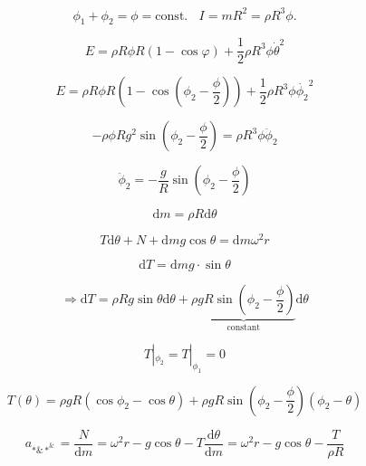 \documentclass{article}
\begin{document}
    $$
    \phi_1+\phi_2=\phi=\mathrm{const}.\ \ \ \ I=mR^2=\rho R^3\phi.
    $$


    $$
    E=\rho R\phi R(1-\cos\varphi)+\frac{1}{2}\rho R^3\phi\dot{\theta}^2
    $$

    $$
    E=\rho R\phi R(1-\cos(\phi_2-\frac{\phi}{2}))+\frac{1}{2}\rho R^3\phi\dot{\phi_2}^2
    $$

    $$
    -\rho\phi Rg^2\sin(\phi_2-\frac{\phi}{2})=\rho R^3\phi\ddot{\phi}_2
    $$

    $$
    \ddot{\phi}_2=-\frac{g}{R}\sin(\phi_2-\frac{\phi}{2})
    $$

    $$
    \mathrm{d}m=\rho R\mathrm{d}\theta 
    $$

    $$
    T\mathrm{d}\theta+N+\mathrm{d}mg\cos\theta=\mathrm{d}m\omega^2r
    $$

    $$
    \mathrm{d}T=\mathrm{d}mg\cdot\sin\theta 
    $$

    $$
    \Rightarrow\mathrm{d}T=\rho Rg\sin\theta\mathrm{d}\theta+\underbrace{\rho gR\sin(\phi_2-\frac{\phi}{2})}_{\mathrm{constant}}\mathrm{d}\theta
    $$

    $$
    T|_{\phi_2}=T|_{\phi_1}=0
    $$

    \begin{equation}
        T(\theta)=\rho gR(\cos{\phi_2}-\cos\theta)+\rho gR\sin(\phi_2-\frac{\phi}{2})(\phi_2-\theta)
    \end{equation}

    \begin{equation}
        a_{*\&*^\&}=\frac{N}{\mathrm{d}m}=\omega^2r-g\cos\theta-T\frac{\mathrm{d}\theta}{\mathrm{d}m}=\omega^2r-g\cos\theta-\frac{T}{\rho R}
    \end{equation}
\end{document}
